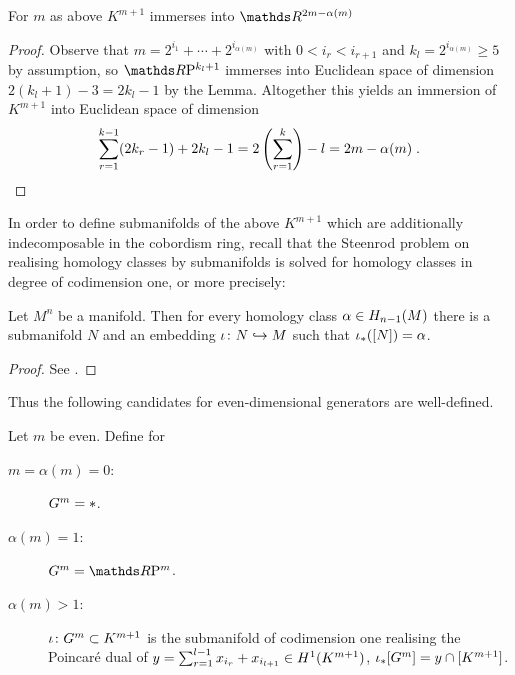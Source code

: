 \begin{Lem}
  For $m$ as above $K^{m+1}$ immerses into $\R^{2m-\alpha(m)}$
  \begin{proof}
    Observe that
    $m=2^{i_1}+\dotsb +2^{i_{\alpha(m)}}$ with $0<i_r< i_{r+1}$ and
    $k_l=2^{i_{\alpha(m)}}\geq 5$ by assumption, so $\RP{k_l+1}$
    immerses into Euclidean space of dimension $2(k_l+1)-3=2k_l-1$ by
    the Lemma.
    Altogether this yields an immersion of $K^{m+1}$ into Euclidean
    space of dimension
  \begin{gather*}
    \sum_{r=1}^{k-1}(2k_r-1) + 2k_l-1
    = 2\left(\sum_{r=1}^{k}\right) - l
    = 2m - \alpha(m)
    \;.
    \qedhere
  \end{gather*}
  \end{proof}
\end{Lem}


In order to define submanifolds of the above $K^{m+1}$ which are
additionally indecomposable in the cobordism ring, recall that the
Steenrod problem on realising homology classes by submanifolds is
solved for homology classes in degree of codimension one, or more
precisely:
\begin{Lem}
  Let $M^n$ be a manifold. Then for every homology class
  $\alpha\in H_{n-1}(M)$ there is a submanifold $N$ and an embedding
  $\iota\colon N\hookrightarrow M$ such that ${\iota}_*([N]) = \alpha$.
  \begin{proof}
    See \cite[Theorem~II.26]{thom}.
  \end{proof}
\end{Lem}

Thus the following candidates for even-dimensional generators are
well-defined.
\begin{Def}
  Let $m$ be even. Define for
  \begin{description}
  \item[$m=\alpha(m)=0$:] $G^{m} = *$.
  \item[$\alpha(m)=1$:] $\G m = \RP m$.
  \item[$\alpha(m)>1$:]
    ${\iota}\colon G^{m}\subset K^{m+1}$ is the submanifold of
    codimension one realising the Poincaré dual of
    $y=\sum_{r=1}^{l-1}x_{i_r} + x_{i_{l+1}}\in H^1(K^{m+1})$,
    \idest ${{\iota}}_*[G^{m}]=y\cap[K^{m+1}]$.
  \end{description}
\end{Def}


